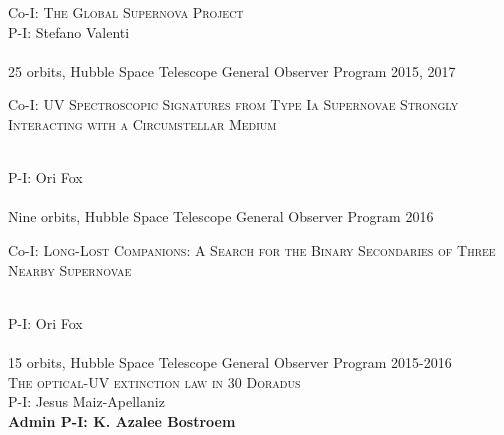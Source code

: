 \documentclass[10pt]{cv}
\begin{document}
\begin{llist}
Co-I: \textsc{The Global Supernova Project}\\
P-I: Stefano Valenti \\
\\
25 orbits, Hubble Space Telescope General Observer Program \hfill 2015, 2017\\ %
\begin{minipage}[l]{0.7\textwidth}\vspace{0.15cm}
Co-I: \textsc{UV Spectroscopic Signatures from Type Ia Supernovae Strongly Interacting with a Circumstellar Medium}
\end{minipage}\vspace{0.15cm}\\
P-I: Ori Fox \\
\\
Nine orbits, Hubble Space Telescope General Observer Program \hfill 2016\\ %
\begin{minipage}[l]{0.7\textwidth}\vspace{0.15cm}
Co-I: \textsc{Long-Lost Companions: A Search for the Binary Secondaries of Three Nearby Supernovae}
\end{minipage}\vspace{0.15cm}\\
P-I: Ori Fox \\
\\
15 orbits, Hubble Space Telescope General Observer Program \hfill 2015-2016\\ %
\textsc{The optical-UV extinction law in 30 Doradus}\\
P-I: Jesus Maiz-Apellaniz \\
{\bf Admin P-I: K. Azalee Bostroem} \\
\\


\end{llist}
\end{document}

